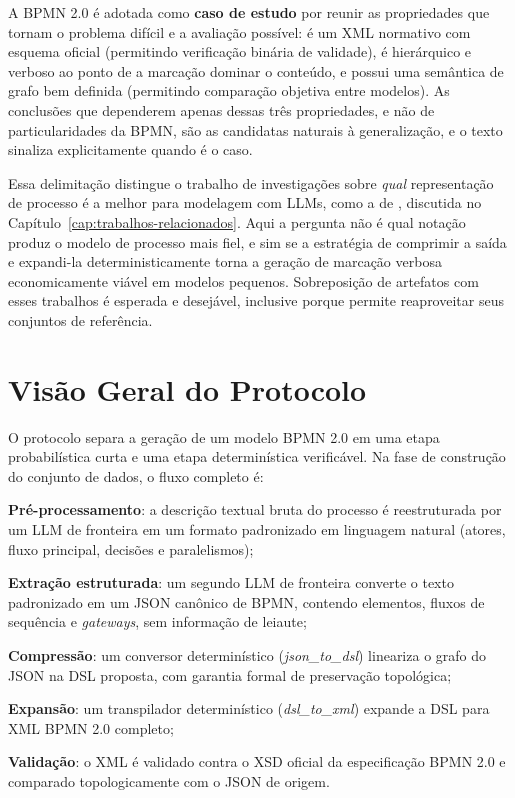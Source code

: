 A BPMN 2.0 é adotada como \textbf{caso de estudo} por reunir as propriedades que tornam o problema difícil e a avaliação possível: é um XML normativo com esquema oficial (permitindo verificação binária de validade), é hierárquico e verboso ao ponto de a marcação dominar o conteúdo, e possui uma semântica de grafo bem definida (permitindo comparação objetiva entre modelos). As conclusões que dependerem apenas dessas três propriedades, e não de particularidades da BPMN, são as candidatas naturais à generalização, e o texto sinaliza explicitamente quando é o caso.

Essa delimitação distingue o trabalho de investigações sobre \textit{qual} representação de processo é a melhor para modelagem com LLMs, como a de , discutida no Capítulo~\ref{cap:trabalhos-relacionados}. Aqui a pergunta não é qual notação produz o modelo de processo mais fiel, e sim se a estratégia de comprimir a saída e expandi-la deterministicamente torna a geração de marcação verbosa economicamente viável em modelos pequenos. Sobreposição de artefatos com esses trabalhos é esperada e desejável, inclusive porque permite reaproveitar seus conjuntos de referência.

\section{Visão Geral do Protocolo}
\label{sec:visao-geral}

O protocolo separa a geração de um modelo BPMN 2.0 em uma etapa probabilística curta e uma etapa determinística verificável. Na fase de construção do conjunto de dados, o fluxo completo é:

\begin{alineascomnumero}
	\item \textbf{Pré-processamento}: a descrição textual bruta do processo é reestruturada por um LLM de fronteira em um formato padronizado em linguagem natural (atores, fluxo principal, decisões e paralelismos);
	\item \textbf{Extração estruturada}: um segundo LLM de fronteira converte o texto padronizado em um JSON canônico de BPMN, contendo elementos, fluxos de sequência e \textit{gateways}, sem informação de leiaute;
	\item \textbf{Compressão}: um conversor determinístico (\textit{json\_to\_dsl}) lineariza o grafo do JSON na DSL proposta, com garantia formal de preservação topológica;
	\item \textbf{Expansão}: um transpilador determinístico (\textit{dsl\_to\_xml}) expande a DSL para XML BPMN 2.0 completo;
	\item \textbf{Validação}: o XML é validado contra o XSD oficial da especificação BPMN 2.0 e comparado topologicamente com o JSON de origem.
\end{alineascomnumero}

